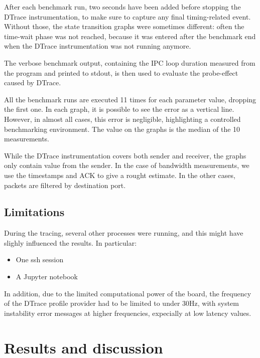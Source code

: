 \documentclass[a4paper,10pt]{article}
\begin{document}
After each benchmark run, two seconds have been added before stopping the DTrace instrumentation, to make sure to capture any final timing-related event. Without those, the state transition graphs were sometimes different: often the time-wait phase was not reached, because it was entered after the benchmark end when the DTrace instrumentation was not running anymore.

The verbose benchmark output, containing the IPC loop duration measured from the program and printed to stdout, is then used to evaluate the probe-effect caused by DTrace.


All the benchmark runs are executed 11 times for each parameter value, dropping the first one. In each graph, it is possible to see the error as a vertical line. However, in almost all cases, this error is negligible, highlighting a controlled benchmarking environment. The value on the graphs is the median of the 10 measurements.

While the DTrace instrumentation covers both sender and receiver, the graphs only contain value from the sender. In the case of bandwidth measurements, we use the timestamps and ACK to give a rought estimate. In the other cases, packets are filtered by destination port.

\subsection{Limitations}

During the tracing, several other processes were running, and this might have slighly influenced the results. In particular:
\begin{itemize}
    \item One ssh session
    \item A Jupyter notebook
\end{itemize}

In addition, due to the limited computational power of the board, the frequency of the DTrace profile provider had to be limited to under 30Hz, with system instability error messages at higher frequencies, expecially at low latency values.

\section{Results and discussion}
\end{document}
